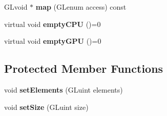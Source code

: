 \begin{DoxyCompactItemize}
\item 
G\+Lvoid $\ast$ {\bfseries map} (G\+Lenum access) const \hypertarget{classflw_1_1flc_1_1IBuffer_ab8174b93310fb75d673246a6c0e84901}{}\label{classflw_1_1flc_1_1IBuffer_ab8174b93310fb75d673246a6c0e84901}

\item 
virtual void {\bfseries empty\+C\+PU} ()=0\hypertarget{classflw_1_1flc_1_1IBuffer_a947b4716bdab96de09bf448211189ad7}{}\label{classflw_1_1flc_1_1IBuffer_a947b4716bdab96de09bf448211189ad7}

\item 
virtual void {\bfseries empty\+G\+PU} ()=0\hypertarget{classflw_1_1flc_1_1IBuffer_ac3793d00dbfcc62b7b78cd9c6edac746}{}\label{classflw_1_1flc_1_1IBuffer_ac3793d00dbfcc62b7b78cd9c6edac746}

\end{DoxyCompactItemize}
\subsection*{Protected Member Functions}
\begin{DoxyCompactItemize}
\item 
void {\bfseries set\+Elements} (G\+Luint elements)\hypertarget{classflw_1_1flc_1_1IBuffer_abfef8a1d484a0a974e1b68899b94793e}{}\label{classflw_1_1flc_1_1IBuffer_abfef8a1d484a0a974e1b68899b94793e}

\item 
void {\bfseries set\+Size} (G\+Luint size)\hypertarget{classflw_1_1flc_1_1IBuffer_a07a92c12bc564ea26ef2091915b992e3}{}\label{classflw_1_1flc_1_1IBuffer_a07a92c12bc564ea26ef2091915b992e3}

\end{DoxyCompactItemize}
